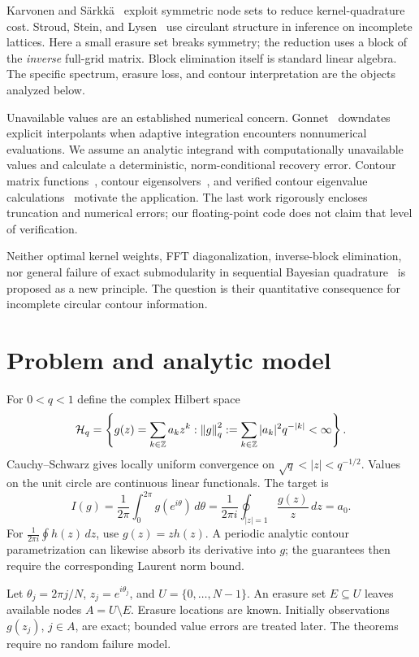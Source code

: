 \documentclass[final,leqno,letterpaper]{etna}
\newcommand{\Hq}{\mathcal H_q}\newcommand{\E}{\mathcal E}
\begin{document}
Karvonen and S\"arkk\"a~\cite{KS18} exploit symmetric node sets to reduce kernel-quadrature cost. Stroud, Stein, and Lysen~\cite{SSL17} use circulant structure in inference on incomplete lattices. Here a small erasure set breaks symmetry; the reduction uses a block of the \emph{inverse} full-grid matrix. Block elimination itself is standard linear algebra. The specific spectrum, erasure loss, and contour interpretation are the objects analyzed below.

Unavailable values are an established numerical concern. Gonnet~\cite{Gonnet10} downdates explicit interpolants when adaptive integration encounters nonnumerical evaluations. We assume an analytic integrand with computationally unavailable values and calculate a deterministic, norm-conditional recovery error. Contour matrix functions~\cite{HHT08}, contour eigensolvers~\cite{SS03}, and verified contour eigenvalue calculations~\cite{IMT20} motivate the application. The last work rigorously encloses truncation and numerical errors; our floating-point code does not claim that level of verification.

Neither optimal kernel weights, FFT diagonalization, inverse-block elimination, nor general failure of exact submodularity in sequential Bayesian quadrature~\cite{HD12} is proposed as a new principle. The question is their quantitative consequence for incomplete circular contour information.

\FloatBarrier
\section{Problem and analytic model}
For $0<q<1$ define the complex Hilbert space
\begin{equation*}
\Hq=\left\{g(z)=\sum_{k\in\mathbb Z}a_kz^k:
\norm g_q^2:=\sum_{k\in\mathbb Z}|a_k|^2q^{-|k|}<\infty\right\}.
\end{equation*}
Cauchy--Schwarz gives locally uniform convergence on $\sqrt q<|z|<q^{-1/2}$. Values on the unit circle are continuous linear functionals. The target is
\begin{equation*}
I(g)=\frac1{2\pi}\int_0^{2\pi}g(e^{i\theta})\,d\theta
=\frac1{2\pi i}\oint_{|z|=1}\frac{g(z)}z\,dz=a_0.
\end{equation*}
For $\frac1{2\pi i}\oint h(z)\,dz$, use $g(z)=zh(z)$. A periodic analytic contour parametrization can likewise absorb its derivative into $g$; the guarantees then require the corresponding Laurent norm bound.

Let $\theta_j=2\pi j/N$, $z_j=e^{i\theta_j}$, and $U=\{0,\ldots,N-1\}$. An erasure set $E\subseteq U$ leaves available nodes $A=U\setminus E$. Erasure locations are known. Initially observations $g(z_j)$, $j\in A$, are exact; bounded value errors are treated later. The theorems require no random failure model.
\end{document}
